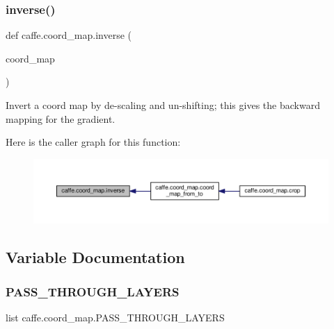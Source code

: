 \subsubsection{\texorpdfstring{inverse()}{inverse()}}
{\footnotesize\ttfamily def caffe.\+coord\+\_\+map.\+inverse (\begin{DoxyParamCaption}\item[{}]{coord\+\_\+map }\end{DoxyParamCaption})}

\begin{DoxyVerb}Invert a coord map by de-scaling and un-shifting;
this gives the backward mapping for the gradient.
\end{DoxyVerb}
 Here is the caller graph for this function\+:
\nopagebreak
\begin{figure}[H]
\begin{center}
\leavevmode
\includegraphics[width=350pt]{namespacecaffe_1_1coord__map_ad03646b133a0a44eb1062c6acf677c8c_icgraph}
\end{center}
\end{figure}


\subsection{Variable Documentation}
\mbox{\label{namespacecaffe_1_1coord__map_a3846a1f9486c7ebe906f163cd50034bc}} 
\subsubsection{\texorpdfstring{P\+A\+S\+S\+\_\+\+T\+H\+R\+O\+U\+G\+H\+\_\+\+L\+A\+Y\+E\+RS}{PASS\_THROUGH\_LAYERS}}
{\footnotesize\ttfamily list caffe.\+coord\+\_\+map.\+P\+A\+S\+S\+\_\+\+T\+H\+R\+O\+U\+G\+H\+\_\+\+L\+A\+Y\+E\+RS}

